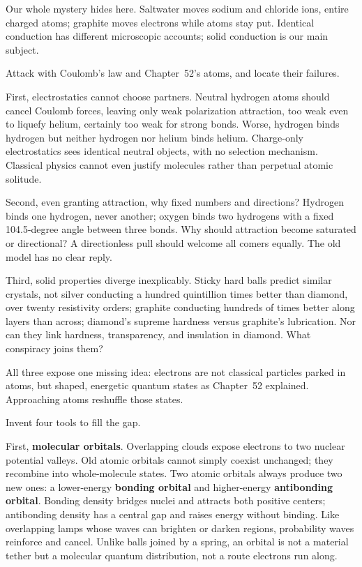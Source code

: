 Our whole mystery hides here. Saltwater moves sodium and chloride ions, entire charged atoms; graphite moves electrons while atoms stay put. Identical conduction has different microscopic accounts; solid conduction is our main subject.


Attack with Coulomb's law and Chapter~52's atoms, and locate their failures.

First, electrostatics cannot choose partners. Neutral hydrogen atoms should cancel Coulomb forces, leaving only weak polarization attraction, too weak even to liquefy helium, certainly too weak for strong bonds. Worse, hydrogen binds hydrogen but neither hydrogen nor helium binds helium. Charge-only electrostatics sees identical neutral objects, with no selection mechanism. Classical physics cannot even justify molecules rather than perpetual atomic solitude.

Second, even granting attraction, why fixed numbers and directions? Hydrogen binds one hydrogen, never another; oxygen binds two hydrogens with a fixed 104.5-degree angle between three bonds. Why should attraction become saturated or directional? A directionless pull should welcome all comers equally. The old model has no clear reply.

Third, solid properties diverge inexplicably. Sticky hard balls predict similar crystals, not silver conducting a hundred quintillion times better than diamond, over twenty resistivity orders; graphite conducting hundreds of times better along layers than across; diamond's supreme hardness versus graphite's lubrication. Nor can they link hardness, transparency, and insulation in diamond. What conspiracy joins them?

All three expose one missing idea: electrons are not classical particles parked in atoms, but shaped, energetic quantum states as Chapter~52 explained. Approaching atoms reshuffle those states.


Invent four tools to fill the gap.

First, \textbf{molecular orbitals}. Overlapping clouds expose electrons to two nuclear potential valleys. Old atomic orbitals cannot simply coexist unchanged; they recombine into whole-molecule states. Two atomic orbitals always produce two new ones: a lower-energy \textbf{bonding orbital} and higher-energy \textbf{antibonding orbital}. Bonding density bridges nuclei and attracts both positive centers; antibonding density has a central gap and raises energy without binding. Like overlapping lamps whose waves can brighten or darken regions, probability waves reinforce and cancel. Unlike balls joined by a spring, an orbital is not a material tether but a molecular quantum distribution, not a route electrons run along.

